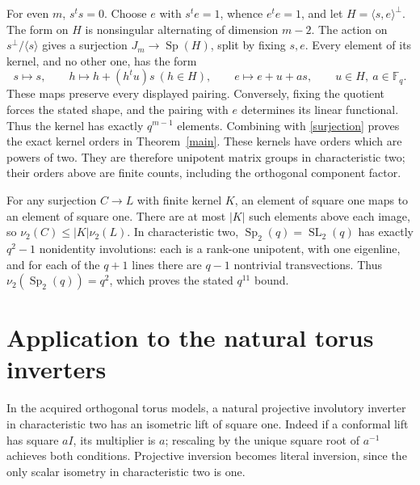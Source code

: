 \documentclass[11pt]{article}
\newcommand{\F}{\mathbb F}\newcommand{\Sp}{\operatorname{Sp}}\newcommand{\diag}{\operatorname{diag}}\newcommand{\Tr}{\operatorname{Tr}}\newcommand{\Om}{\Omega}
\begin{document}
For even $m$, $s^ts=0$. Choose $e$ with $s^te=1$, whence $e^te=1$,
and let $H=\langle s,e\rangle^\perp$. The form on $H$ is nonsingular
alternating of dimension $m-2$. The action on $s^\perp/\langle s\rangle$
gives a surjection $J_m\to\Sp(H)$, split by fixing $s,e$.
Every element of its kernel, and no other one, has the form
\[
 s\mapsto s,\qquad h\mapsto h+(h^tu)s\ (h\in H),\qquad
 e\mapsto e+u+a s,\qquad u\in H,\ a\in\F_q.
\]
These maps preserve every displayed pairing. Conversely, fixing the
quotient forces the stated shape, and the pairing with $e$ determines
its linear functional. Thus the kernel has exactly $q^{m-1}$ elements.
Combining with \eqref{surjection} proves the exact kernel orders in
Theorem~\ref{main}.
These kernels have orders which are powers of two. They are therefore
unipotent matrix groups in characteristic two; their orders above are
finite counts, including the orthogonal component factor.

For any surjection $C\to L$ with finite kernel $K$, an element of square
one maps to an element of square one. There are at most $|K|$ such elements
above each image, so $\nu_2(C)\le|K|\nu_2(L)$. In characteristic two,
$\Sp_2(q)=\operatorname{SL}_2(q)$ has exactly $q^2-1$ nonidentity
involutions: each is a rank-one unipotent, with one eigenline, and for
each of the $q+1$ lines there are $q-1$ nontrivial transvections.
Thus $\nu_2(\Sp_2(q))=q^2$, which proves the stated $q^{11}$ bound.

\section{Application to the natural torus inverters}
In the acquired orthogonal torus models, a natural projective involutory
inverter in characteristic two has an isometric lift of square one.
Indeed if a conformal lift has square $aI$, its multiplier is $a$;
rescaling by the unique square root of $a^{-1}$ achieves both conditions.
Projective inversion becomes literal inversion, since the only scalar
isometry in characteristic two is one.
\end{document}
